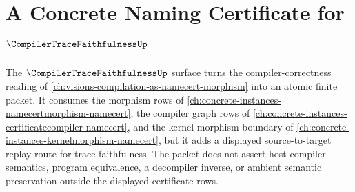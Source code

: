 \chapter{A Concrete Naming Certificate for $\CompilerTraceFaithfulnessUp$}
\label{ch:concrete-instances-compilertracefaithfulness-namecert}

The $\CompilerTraceFaithfulnessUp$ surface turns the compiler-correctness reading of \autoref{ch:visions-compilation-as-namecert-morphism} into an atomic finite packet. It consumes the morphism rows of \autoref{ch:concrete-instances-namecertmorphism-namecert}, the compiler graph rows of \autoref{ch:concrete-instances-certificatecompiler-namecert}, and the kernel morphism boundary of \autoref{ch:concrete-instances-kernelmorphism-namecert}, but it adds a displayed source-to-target replay route for trace faithfulness. The packet does not assert host compiler semantics, program equivalence, a decompiler inverse, or ambient semantic preservation outside the displayed certificate rows.



